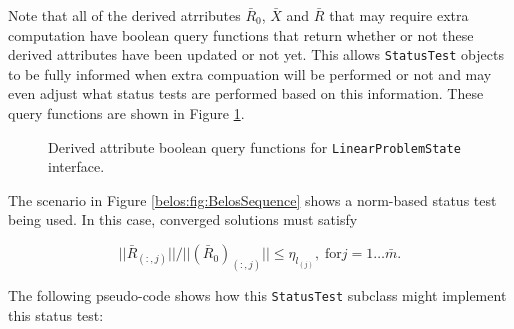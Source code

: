 \documentclass[pdf,ps2pdf,11pt]{SANDreport}
\begin{document}
\begin{enumerate}
Note that all of the derived atrributes $\bar{R}_0$, $\bar{X}$ and
$\bar{R}$ that may require extra computation have boolean query
functions that return whether or not these derived attributes have
been updated or not yet.  This allows {}\texttt{Status\-Test} objects
to be fully informed when extra compuation will be performed or not
and may even adjust what status tests are performed based on this
information.  These query functions are shown in Figure
{}\ref{fig:LinearProblemState-bool-functions}.

\begin{figure}


\caption{\label{fig:LinearProblemState-bool-functions}
Derived attribute boolean query functions for
{}\texttt{Linear\-Problem\-State} interface.  }

\end{figure}

The scenario in Figure {}\ref{belos:fig:BelosSequence} shows a
norm-based status test being used.  In this case, converged solutions
must satisfy

\[
||\bar{R}_{(:,j)}|| / ||(\bar{R}_0)_{(:,j)}|| \leq \eta_{l_{(j)}}, \;
\mbox{for} j = 1 \ldots \bar{m}.
\]

The following pseudo-code shows how this {}\texttt{Status\-Test}
subclass might implement this status test:


\end{enumerate}
\end{document}
